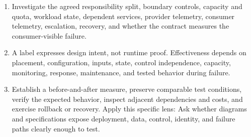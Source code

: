 \documentclass[11pt]{article}
\begin{document}
\begin{enumerate}
\item Investigate the agreed responsibility split, boundary controls, capacity and quota, workload state, dependent services, provider telemetry, consumer telemetry, escalation, recovery, and whether the contract measures the consumer-visible failure.
\item A label expresses design intent, not runtime proof. Effectiveness depends on placement, configuration, inputs, state, control independence, capacity, monitoring, response, maintenance, and tested behavior during failure.
\item Establish a before-and-after measure, preserve comparable test conditions, verify the expected behavior, inspect adjacent dependencies and costs, and exercise rollback or recovery. Apply this specific lens: Ask whether diagrams and specifications expose deployment, data, control, identity, and failure paths clearly enough to test.
\end{enumerate}
\end{document}
